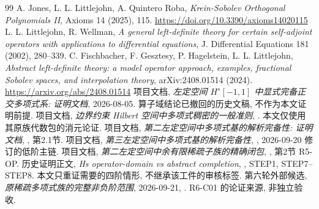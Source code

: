 \documentclass[UTF8]{ctexart}
\begin{document}
\begin{thebibliography}{99}
 A. Jones, L. L. Littlejohn, A. Quintero Roba, \emph{Krein-Sobolev
	Orthogonal Polynomials II}, Axioms 14 (2025), 115.
	\url{https://doi.org/10.3390/axioms14020115}
 L. L. Littlejohn, R. Wellman, \emph{A general left-definite theory
	for certain self-adjoint operators with applications to differential equations},
	J. Differential Equations 181 (2002), 280--339.
 C. Fischbacher, F. Gesztesy, P. Hagelstein, L. L. Littlejohn,
	\emph{Abstract left-definite theory: a model operator approach, examples,
	fractional Sobolev spaces, and interpolation theory}, arXiv:2408.01514 (2024).
	\url{https://arxiv.org/abs/2408.01514}
 项目文档, \emph{左定空间 $H^s[-1,1]$ 中显式完备正交多项式系: 证明文档},
	2026-08-05. 算子域结论已撤回的历史文稿, 不作为本文证明前提.
 项目文档, \emph{边界约束 Hilbert 空间中多项式稠密的一般准则},
	. 本文仅使用其原族代数包的消元论证.
 项目文档, \emph{第二左定空间中多项式基的解析完备性: 证明文档},
	, 第2.1节.
 项目文档, \emph{第三左定空间中多项式基的解析完备性},
	, 2026-09-20 修订的低阶主链.
 项目文档, \emph{第二左定空间中余有限稀疏子族的精确闭包},
	, 第2节 R5-OP.
 历史证明正文, \emph{Hs operator-domain vs abstract completion},
	,
	STEP1, STEP7--STEP8. 本文只重证需要的四阶情形, 不继承该工件的审核标签.
 第六轮外部候选, \emph{原稀疏多项式族的完整非负阶范围},
	2026-09-21,
	.
	R6-C01 的论证来源, 非独立验收.
\end{thebibliography}
\end{document}
